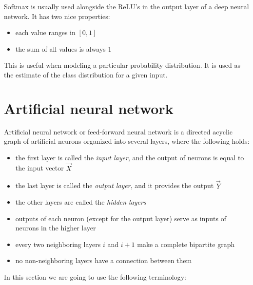 \noindent
Softmax is usually used alongside the ReLU's in the output layer of a deep neural network. It has two nice properties:

\begin{itemize}

\item each value ranges in $[0, 1]$
\item the sum of all values is always 1

\end{itemize}

This is useful when modeling a particular probability distribution. It is used as the estimate of the class distribution for a given input.

\section{Artificial neural network}

Artificial neural network\cite{nn_book} or feed-forward neural network is a directed acyclic graph of artificial neurons organized into several layers, where the following holds:

\begin{itemize}

\item the first layer is called the \textit{input layer}, and the output of neurons is equal to the input vector $\overrightarrow{X}$

\item the last layer is called the \textit{output layer}, and it provides the output $\overrightarrow{Y}$

\item the other layers are called the \textit{hidden layers}

\item outputs of each neuron (except for the output layer) serve as inputs of neurons in the higher layer

\item every two neighboring layers $i$ and $i+1$ make a complete bipartite graph

\item no non-neighboring layers have a connection between them

\end{itemize}

\noindent
In this section we are going to use the following terminology:

